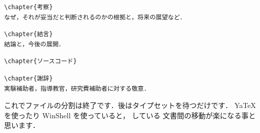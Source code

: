 \begin{verbatim}
\chapter{考察}
なぜ，それが妥当だと判断されるのかの根拠と，将来の展望など．
\end{verbatim}

\begin{verbatim}
\chapter{結言}
結論と，今後の展開．
\end{verbatim}

\begin{verbatim}
\chapter{ソースコード}
\end{verbatim}

\begin{verbatim}
\chapter{謝辞}
実験補助者，指導教官，研究費補助者に対する敬意．
\end{verbatim}

これでファイルの分割は終了です．後はタイプセットを待つだけです．
Ya\TeX を使ったり WinShell を使っていると， している
文書間の移動が楽になる事と思います．

\printindex


